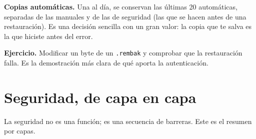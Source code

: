 \textbf{Copias automáticas.} Una al día, se conservan las últimas 20 automáticas, separadas de las manuales y de las de seguridad (las que se hacen antes de una restauración). Es una decisión sencilla con un gran valor: la copia que te salva es la que hiciste antes del error.

\textbf{Ejercicio.} Modificar un byte de un \texttt{.rembak} y comprobar que la restauración falla. Es la demostración más clara de qué aporta la autenticación.

\chapter{Seguridad, de capa en capa}\label{cap:seguridad}\label{seguridad-de-capa-en-capa}

La seguridad no es una función; es una secuencia de barreras. Este es el resumen por capas.

